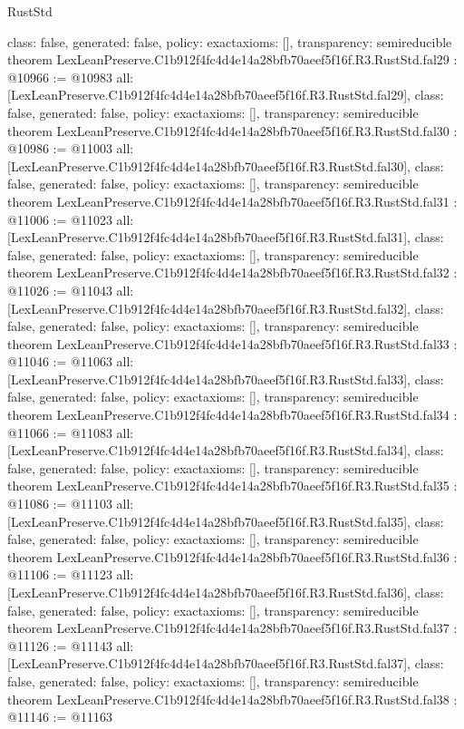 \begin{lexlean}{RustStd}
\begin{coremodule}
{  class: false,
  generated: false,
  policy: exact{axioms: []},
  transparency: semireducible
}
theorem LexLeanPreserve.C1b912f4fc4d4e14a28bfb70aeef5f16f.R3.RustStd.fal29 : @10966 := @10983 {
  all: [LexLeanPreserve.C1b912f4fc4d4e14a28bfb70aeef5f16f.R3.RustStd.fal29],
  class: false,
  generated: false,
  policy: exact{axioms: []},
  transparency: semireducible
}
theorem LexLeanPreserve.C1b912f4fc4d4e14a28bfb70aeef5f16f.R3.RustStd.fal30 : @10986 := @11003 {
  all: [LexLeanPreserve.C1b912f4fc4d4e14a28bfb70aeef5f16f.R3.RustStd.fal30],
  class: false,
  generated: false,
  policy: exact{axioms: []},
  transparency: semireducible
}
theorem LexLeanPreserve.C1b912f4fc4d4e14a28bfb70aeef5f16f.R3.RustStd.fal31 : @11006 := @11023 {
  all: [LexLeanPreserve.C1b912f4fc4d4e14a28bfb70aeef5f16f.R3.RustStd.fal31],
  class: false,
  generated: false,
  policy: exact{axioms: []},
  transparency: semireducible
}
theorem LexLeanPreserve.C1b912f4fc4d4e14a28bfb70aeef5f16f.R3.RustStd.fal32 : @11026 := @11043 {
  all: [LexLeanPreserve.C1b912f4fc4d4e14a28bfb70aeef5f16f.R3.RustStd.fal32],
  class: false,
  generated: false,
  policy: exact{axioms: []},
  transparency: semireducible
}
theorem LexLeanPreserve.C1b912f4fc4d4e14a28bfb70aeef5f16f.R3.RustStd.fal33 : @11046 := @11063 {
  all: [LexLeanPreserve.C1b912f4fc4d4e14a28bfb70aeef5f16f.R3.RustStd.fal33],
  class: false,
  generated: false,
  policy: exact{axioms: []},
  transparency: semireducible
}
theorem LexLeanPreserve.C1b912f4fc4d4e14a28bfb70aeef5f16f.R3.RustStd.fal34 : @11066 := @11083 {
  all: [LexLeanPreserve.C1b912f4fc4d4e14a28bfb70aeef5f16f.R3.RustStd.fal34],
  class: false,
  generated: false,
  policy: exact{axioms: []},
  transparency: semireducible
}
theorem LexLeanPreserve.C1b912f4fc4d4e14a28bfb70aeef5f16f.R3.RustStd.fal35 : @11086 := @11103 {
  all: [LexLeanPreserve.C1b912f4fc4d4e14a28bfb70aeef5f16f.R3.RustStd.fal35],
  class: false,
  generated: false,
  policy: exact{axioms: []},
  transparency: semireducible
}
theorem LexLeanPreserve.C1b912f4fc4d4e14a28bfb70aeef5f16f.R3.RustStd.fal36 : @11106 := @11123 {
  all: [LexLeanPreserve.C1b912f4fc4d4e14a28bfb70aeef5f16f.R3.RustStd.fal36],
  class: false,
  generated: false,
  policy: exact{axioms: []},
  transparency: semireducible
}
theorem LexLeanPreserve.C1b912f4fc4d4e14a28bfb70aeef5f16f.R3.RustStd.fal37 : @11126 := @11143 {
  all: [LexLeanPreserve.C1b912f4fc4d4e14a28bfb70aeef5f16f.R3.RustStd.fal37],
  class: false,
  generated: false,
  policy: exact{axioms: []},
  transparency: semireducible
}
theorem LexLeanPreserve.C1b912f4fc4d4e14a28bfb70aeef5f16f.R3.RustStd.fal38 : @11146 := @11163 {
}
\end{coremodule}
\end{lexlean}
